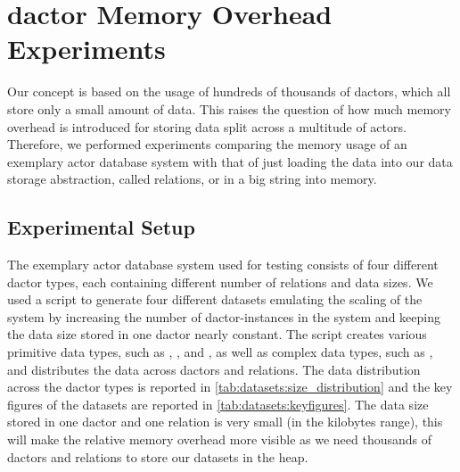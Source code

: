 
\section[Dactor Memory Overhead Experiments]{\Gls{dactor} Memory Overhead Experiments}\label{sec:experiments}

  Our concept is based on the usage of hundreds of thousands of \glspl{dactor}, which all store only a small amount of data.
  This raises the question of how much memory overhead is introduced for storing data split across a multitude of actors.
  Therefore, we performed experiments comparing the memory usage of an exemplary actor database system with that of just loading the data into our data storage abstraction, called relations, or in a big string into memory.

\subsection{Experimental Setup}

  The exemplary actor database system used for testing consists of four different \gls{dactor} types, each containing different number of relations and data sizes.
  We used a script to generate four different datasets emulating the scaling of the system by increasing the number of \gls{dactor}-instances in the system and keeping the data size stored in one \gls{dactor} nearly constant.
  The script creates various primitive data types, such as , , and , as well as complex data types, such as , and distributes the data across \glspl{dactor} and relations.
  The data distribution across the \gls{dactor} types is reported in \cref{tab:datasets:size_distribution} and the key figures of the datasets are reported in \cref{tab:datasets:keyfigures}.
  The data size stored in one \gls{dactor} and one relation is very small (in the kilobytes range), this will make the relative memory overhead more visible as we need thousands of \glspl{dactor} and relations to store our datasets in the heap.
  
